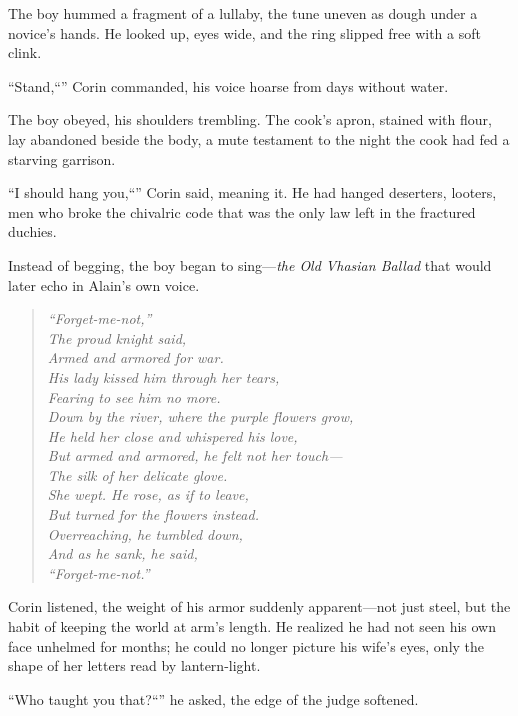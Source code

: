 \documentclass[11pt,twoside]{book}
\begin{document}
The boy hummed a fragment of a lullaby, the tune uneven as dough under a novice's hands.  He looked up, eyes wide, and the ring slipped free with a soft clink.

``Stand,``'' Corin commanded, his voice hoarse from days without water.

The boy obeyed, his shoulders trembling.  The cook's apron, stained with flour, lay abandoned beside the body, a mute testament to the night the cook had fed a starving garrison.

``I should hang you,``'' Corin said, meaning it.  He had hanged deserters, looters, men who broke the chivalric code that was the only law left in the fractured duchies.

Instead of begging, the boy began to sing---\emph{the Old Vhasian Ballad} that would later echo in Alain's own voice.

\begin{verse}
\emph{``Forget-me-not,''}\\
\emph{The proud knight said,}\\
\emph{Armed and armored for war.}\\
\emph{His lady kissed him through her tears,}\\
\emph{Fearing to see him no more.}\\[4pt]

\emph{Down by the river, where the purple flowers grow,}\\
\emph{He held her close and whispered his love,}\\
\emph{But armed and armored, he felt not her touch---}\\
\emph{The silk of her delicate glove.}\\[4pt]

\emph{She wept. He rose, as if to leave,}\\
\emph{But turned for the flowers instead.}\\
\emph{Overreaching, he tumbled down,}\\
\emph{And as he sank, he said,}\\
\emph{``Forget-me-not.''}
\end{verse}

Corin listened, the weight of his armor suddenly apparent---not just steel, but the habit of keeping the world at arm's length.  He realized he had not seen his own face unhelmed for months; he could no longer picture his wife's eyes, only the shape of her letters read by lantern-light.

``Who taught you that?``'' he asked, the edge of the judge softened.
\end{document}
